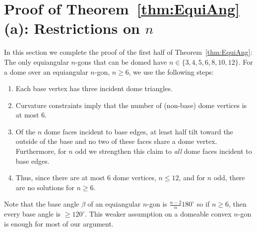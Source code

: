 \documentclass[11pt]{article}
\newcommand{\thmref}[1]{\ref{thm:#1}}
\def\b{{\beta}}
\newcommand{\JOR}[1]{{\color{red} JOR: [#1]}}
\newcommand{\Anna}[1]{{\color{red} Anna: [#1]}}
\newcommand{\anna}[1]{{\color{blue} #1}}
\begin{document}
\section{Proof of Theorem~\thmref{EquiAng}(a): Restrictions on $n$}
\label{sec:part-a}
In this section we complete the proof of
the first half of Theorem~\thmref{EquiAng}:
The only equiangular %
$n$-gons 
that can be domed have $n \in \{3,4,5,6,8,10,12\}$.
For a dome over an equiangular $n$-gon, $n \ge 6$, we use the following steps: 
%
\begin{enumerate}[(1)]
\item Each base vertex has three incident dome triangles.

\item Curvature constraints imply that 
the number of (non-base) dome vertices is at most 6.

\item Of the $n$ dome faces incident to base edges, at least half tilt toward the outside of the base
and no two of these faces share a dome vertex.
Furthermore, for $n$ odd we strengthen this claim to \emph{all} dome faces incident to base edges. 

\item Thus, since there are at most 6 dome vertices, 
$n \le 12$, and for $n$ odd, 
there are no solutions for $n \ge 6$.
\end{enumerate}

Note that the base angle $\b$ of   
an equiangular $n$-gon
is $\frac{n-2}{n} 180^\circ$
so if $n \ge 6$, then every base angle is $\ge 120^\circ$. 
This weaker assumption 
on a domeable convex 
$n$-gon
is enough for most of our argument.
\end{document}
